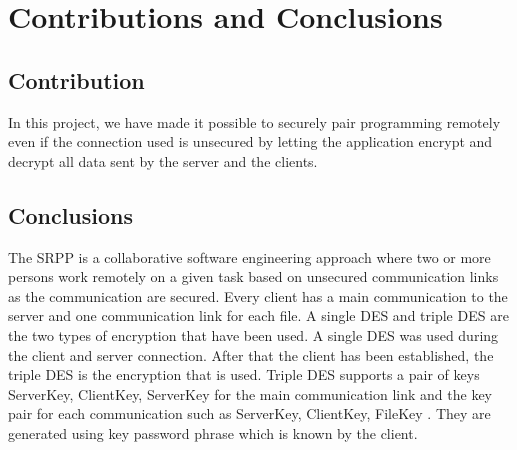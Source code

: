 \section{Contributions and Conclusions}

\subsection{Contribution}

In this project, we have made it possible to securely pair programming remotely even if the connection used is unsecured by letting the application encrypt and decrypt all data sent by the server and the clients.


\subsection{Conclusions}
The SRPP is a collaborative software engineering approach where  two or more persons work remotely on a given task based on unsecured communication links as the communication are secured. Every client has a main communication to the server and one communication link for each file. A single DES and triple DES are the two types of encryption that have been used.  A single DES was used during the client and server connection. After that the client has been  established, the triple DES is the encryption that is used. Triple DES supports a pair of keys { ServerKey, ClientKey, ServerKey } for the main communication link and the key pair for each communication such as { ServerKey, ClientKey, FileKey }. They are generated using key password phrase which is known by the client. 
